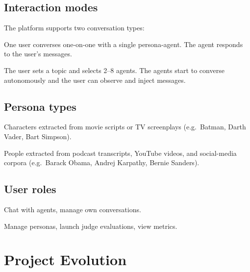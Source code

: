 \documentclass[12pt,a4paper]{article}
\begin{document}
\subsection{Interaction modes}

The platform supports two conversation types:

\begin{description}[leftmargin=2cm,labelwidth=1.8cm]
  \item[\textbf{DM}] One user converses one-on-one with a single persona-agent. The agent responds to the user's messages.
  \item[\textbf{Group chat}] The user sets a topic and selects 2--8 agents. The agents start to converse
        autonomously and the user can observe and inject messages.
\end{description}

\subsection{Persona types}

\begin{description}[leftmargin=2cm,labelwidth=1.8cm]
  \item[\textbf{Fiction}] Characters extracted from movie scripts or TV screenplays
        (e.g.\ Batman, Darth Vader, Bart Simpson).
  \item[\textbf{Real-world}] People extracted from podcast transcripts, YouTube videos, and
        social-media corpora (e.g.\ Barack Obama, Andrej Karpathy, Bernie Sanders).
\end{description}

\subsection{User roles}

\begin{description}[leftmargin=2cm,labelwidth=1.8cm]
  \item[\textbf{Common user}] Chat with agents, manage own conversations.
  \item[\textbf{Admin}] Manage personas, launch judge evaluations, view metrics.
\end{description}

\section{Project Evolution}
\end{document}
